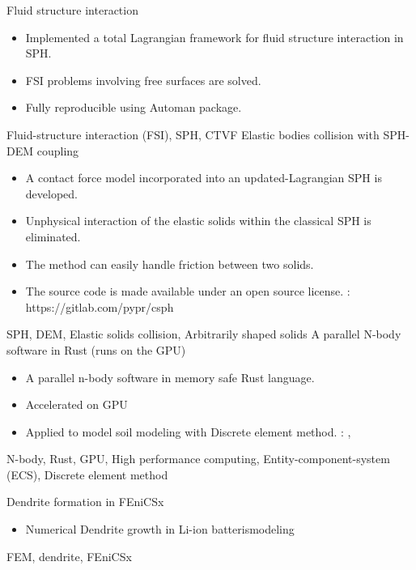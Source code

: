 \begin{experiences}
  \emptySeparator
  \experience
  {} {Fluid structure interaction}{}{}
  {}    {
    \begin{itemize}
        \item Implemented a total Lagrangian framework for fluid structure interaction in SPH.
        \item FSI problems involving free surfaces are solved.
        \item Fully reproducible using Automan package.
    \end{itemize}
  }
  {Fluid-structure interaction (FSI), SPH, CTVF}
  \emptySeparator
  \experience
  {} {Elastic bodies collision with SPH-DEM coupling}{}{}
  {} {
                      \begin{itemize}
                      \item  A contact force model incorporated into an updated-Lagrangian SPH is developed.
                      \item  Unphysical interaction of the elastic solids within the classical SPH is eliminated.
                      \item  The method can easily handle friction between two solids.
                      \item  The source code is made available under an open source license.
                        \faGithub:  {https://gitlab.com/pypr/csph}
                      \end{itemize}
                    }
                    {SPH, DEM, Elastic solids collision, Arbitrarily shaped solids}
  \emptySeparator
  \experience
  {} {A parallel N-body software in Rust (runs on the GPU)}{}{}
  {}    {
    \begin{itemize}
      \item A parallel n-body software in memory safe Rust language.
      \item Accelerated on GPU
      \item Applied to model soil modeling with Discrete element method.
        \faGithub: ,
    \end{itemize}
  }
  {N-body, Rust, GPU, High performance computing, Entity-component-system (ECS), Discrete element method}

  \emptySeparator
  \experience
  {} {Dendrite formation in FEniCSx}{}{}
  {}    {
    \begin{itemize}
    \item Numerical Dendrite growth in Li-ion batterismodeling
    \end{itemize}
  }
  {FEM, dendrite, FEniCSx}


\end{experiences}
